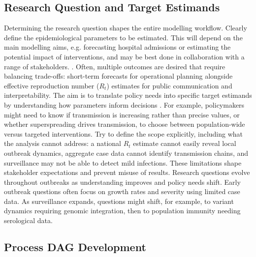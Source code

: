 \documentclass{article}
\begin{document}
\subsection{Research Question and Target Estimands} \label{sec:research-question}

Determining the research question shapes the entire modelling workflow.
Clearly define the epidemiological parameters to be estimated. This will depend on the main modelling aims, e.g. forecasting hospital admissions or estimating the potential impact of interventions, and may be best done in collaboration with a range of stakeholders. \citep{marshall2024when}.
Often, multiple outcomes are desired that require balancing trade-offs: short-term forecasts for operational planning alongside effective reproduction number ($R_t$) estimates for public communication and interpretability.
The aim is to translate policy needs into specific target estimands by understanding how parameters inform decisions \citep{nicholson2022interoperability, gip-2024-ru}.
For example, policymakers might need to know if transmission is increasing rather than precise values, or whether superspreading drives transmission, to choose between population-wide versus targeted interventions.
Try to define the scope explicitly, including what the analysis cannot address: a national $R_t$ estimate cannot easily reveal local outbreak dynamics, aggregate case data cannot identify transmission chains, and surveillance may not be able to detect mild infections.
These limitations shape stakeholder expectations and prevent misuse of results.
Research questions evolve throughout outbreaks as understanding improves and policy needs shift.
Early outbreak questions often focus on growth rates and severity using limited case data.
As surveillance expands, questions might shift, for example, to variant dynamics requiring genomic integration, then to population immunity needing serological data.

\subsection{Process DAG Development} \label{sec:process}
\end{document}
